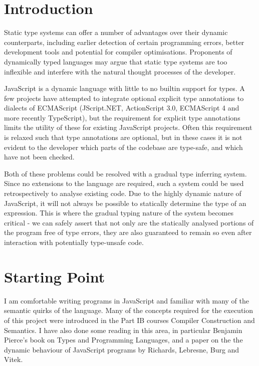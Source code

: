 


\section{Introduction}\label{introduction}

Static type systems can offer a number of advantages over their dynamic
counterparts, including earlier detection of certain programming errors,
better development tools and potential for compiler optimisations.
Proponents of dynamically typed languages may argue that static type
systems are too inflexible and interfere with the natural thought
processes of the developer.

JavaScript is a dynamic language with little to no builtin support for
types. A few projects have attempted to integrate optional explicit type
annotations to dialects of ECMAScript (JScript.NET, ActionScript 3.0,
ECMAScript 4 and more recently TypeScript), but the requirement for
explicit type annotations limits the utility of these for existing
JavaScript projects. Often this requirement is relaxed such that type
annotations are optional, but in these cases it is not evident to the
developer which parts of the codebase are type-safe, and which have not
been checked.

Both of these problems could be resolved with a gradual type inferring
system. Since no extensions to the language are required, such a system
could be used retrospectively to analyse existing code. Due to the
highly dynamic nature of JavaScript, it will not always be possible to
statically determine the type of an expression. This is where the
gradual typing nature of the system becomes critical - we can safely
assert that not only are the statically analysed portions of the program
free of type errors, they are also guaranteed to remain so even after
interaction with potentially type-unsafe code.

\section{Starting Point}\label{starting-point}

I am comfortable writing programs in JavaScript and familiar with many
of the semantic quirks of the language. Many of the concepts required
for the execution of this project were introduced in the Part IB courses
Compiler Construction and Semantics. I have also done some reading in
this area, in particular Benjamin Pierce's book on Types and Programming
Languages, and a paper on the the dynamic behaviour of JavaScript
programs by Richards, Lebresne, Burg and Vitek.


